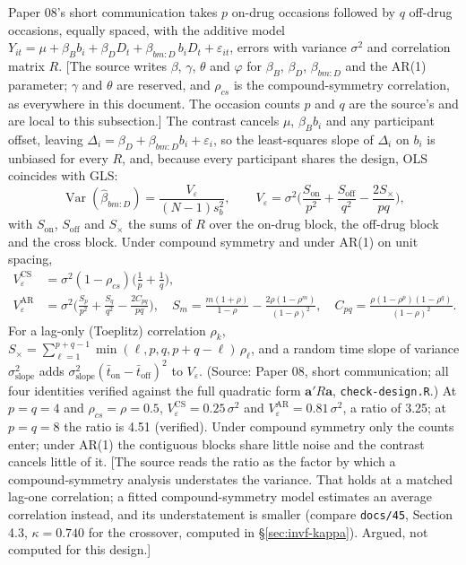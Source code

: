 \documentclass[11pt]{article}
\newcommand{\note}[1]{\textcolor{blue!60!black}{\small [#1]}}
\newcommand{\code}[1]{\texttt{#1}}
\begin{document}
Paper 08's short communication takes $p$ on-drug occasions followed by
$q$ off-drug occasions, equally spaced, with the additive model
$Y_{it} = \mu + \beta_B b_i + \beta_D D_t + \beta_{bm:D}\,b_iD_t +
\varepsilon_{it}$, errors with variance $\sigma^2$ and correlation matrix $R$.
\note{The source writes $\beta$, $\gamma$, $\theta$ and $\varphi$ for
$\beta_B$, $\beta_D$, $\beta_{bm:D}$ and the AR(1) parameter; $\gamma$
and $\theta$ are reserved, and $\rho_{cs}$ is the compound-symmetry
correlation, as everywhere in this document. The occasion counts $p$
and $q$ are the source's and are local to this subsection.} The contrast
cancels $\mu$, $\beta_B b_i$ and any participant offset, leaving
$\Delta_i = \beta_D + \beta_{bm:D}b_i + \varepsilon_i$, so the
least-squares slope of $\Delta_i$ on $b_i$ is unbiased for every $R$,
and, because every participant shares the design, OLS coincides with
GLS:
\begin{equation}
\operatorname{Var}(\hat\beta_{bm:D}) = \frac{V_\varepsilon}{(N-1)s_b^2},
\qquad
V_\varepsilon = \sigma^2\Big(\frac{S_{\text{on}}}{p^2}
  + \frac{S_{\text{off}}}{q^2} - \frac{2S_\times}{pq}\Big),
\label{eq:bp-master}
\end{equation}
with $S_{\text{on}}$, $S_{\text{off}}$ and $S_\times$ the sums of $R$
over the on-drug block, the off-drug block and the cross block. Under
compound symmetry and under AR(1) on unit spacing,
\begin{align}
V_\varepsilon^{\mathrm{CS}} &= \sigma^2(1 - \rho_{cs})
  \Big(\frac1p + \frac1q\Big),
  \label{eq:bp-vcs} \\
V_\varepsilon^{\mathrm{AR}} &= \sigma^2\Big(\frac{S_p}{p^2}
  + \frac{S_q}{q^2} - \frac{2C_{pq}}{pq}\Big), \quad
  S_m = \frac{m(1+\rho)}{1-\rho} - \frac{2\rho(1-\rho^m)}{(1-\rho)^2},
  \quad C_{pq} = \frac{\rho(1-\rho^p)(1-\rho^q)}{(1-\rho)^2}.
  \label{eq:bp-var}
\end{align}
For a lag-only (Toeplitz) correlation $\rho_k$, $S_\times =
\sum_{\ell=1}^{p+q-1}\min(\ell, p, q, p+q-\ell)\,\rho_\ell$, and a random
time slope of variance $\sigma_{\text{slope}}^2$ adds
$\sigma_{\text{slope}}^2(\bar t_{\text{on}} - \bar t_{\text{off}})^2$ to
$V_\varepsilon$. (Source: Paper 08, short communication; all four
identities verified against the full quadratic form $\mathbf a'R\mathbf
a$, \code{check-design.R}.) At $p = q = 4$ and $\rho_{cs} = \rho
= 0.5$, $V^{\mathrm{CS}}_\varepsilon = 0.25\,\sigma^2$ and
$V^{\mathrm{AR}}_\varepsilon = 0.81\,\sigma^2$, a ratio of 3.25; at
$p = q = 8$ the ratio is 4.51 (verified). Under compound symmetry only
the counts enter; under AR(1) the contiguous blocks share little noise
and the contrast cancels little of it. \note{The source reads the ratio
as the factor by which a compound-symmetry analysis understates the
variance. That holds at a matched lag-one correlation; a fitted
compound-symmetry model estimates an average correlation instead, and
its understatement is smaller (compare \code{docs/45}, Section 4.3,
$\kappa = 0.740$ for the crossover, computed in
\S\ref{sec:invf-kappa}). Argued, not computed for this design.}
\end{document}
